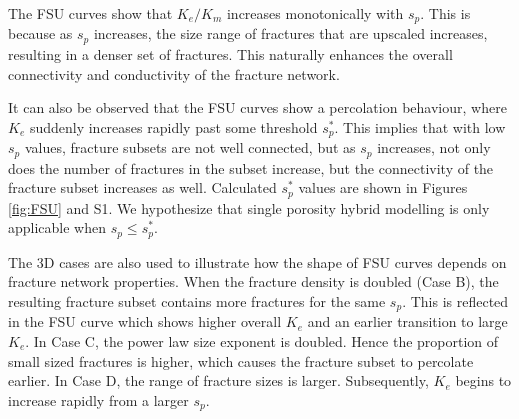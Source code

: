 \documentclass[draft]{agujournal2018}
\begin{document}

The FSU curves show that $K_e/K_m$ increases monotonically with $s_p$. This is because as $s_p$ increases, the size range of fractures that are upscaled increases, resulting in a denser set of fractures. This naturally enhances the overall connectivity and conductivity of the fracture network.

It can also be observed that the FSU curves show a percolation behaviour, where $K_e$ suddenly increases rapidly past some threshold $s_p^*$. This implies that with low $s_p$ values, fracture subsets are not well connected, but as $s_p$ increases, not only does the number of fractures in the subset increase, but the connectivity of the fracture subset increases as well. Calculated $s_p^*$ values are shown in Figures \ref{fig:FSU} and S1. We hypothesize that single porosity hybrid modelling is only applicable when $s_p\leq s_p^*$.

The 3D cases are also used to illustrate how the shape of FSU curves depends on fracture network properties. When the fracture density is doubled (Case B), the resulting fracture subset contains more fractures for the same $s_p$. This is reflected in the FSU curve which shows higher overall $K_e$ and an earlier transition to large $K_e$. In Case C, the power law size exponent is doubled. Hence the proportion of small sized fractures is higher, which causes the fracture subset to percolate earlier. In Case D, the range of fracture sizes is larger. Subsequently, $K_e$ begins to increase rapidly from a larger $s_p$.
\end{document}
